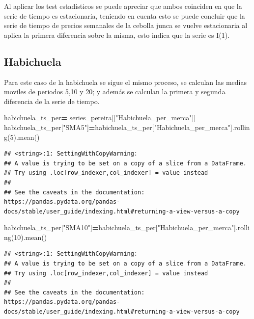 \documentclass[
]{book}
\newenvironment{Shaded}{\begin{snugshade}}{\end{snugshade}}
\newcommand{\DecValTok}[1]{\textcolor[rgb]{0.00,0.00,0.81}{#1}}
\newcommand{\NormalTok}[1]{#1}
\newcommand{\OperatorTok}[1]{\textcolor[rgb]{0.81,0.36,0.00}{\textbf{#1}}}
\newcommand{\StringTok}[1]{\textcolor[rgb]{0.31,0.60,0.02}{#1}}
\begin{document}
Al aplicar los test estadísticos se puede apreciar que ambos coinciden en que la serie de tiempo es estacionaria, teniendo en cuenta esto se puede concluir que la serie de tiempo de precios semanales de la cebolla junca se vuelve estacionaria al aplica la primera diferencia sobre la misma, esto indica que la serie es I(1).

\hypertarget{habichuela-1}{%
\subsection{Habichuela}\label{habichuela-1}}

Para este caso de la habichuela se sigue el mismo proceso, se calculan las medias moviles de periodos 5,10 y 20; y además se calculan la primera y segunda diferencia de la serie de tiempo.

\begin{Shaded}
\begin{Highlighting}[]

\NormalTok{habichuela\_ts\_per}\OperatorTok{=}\NormalTok{ series\_pereira[[}\StringTok{"Habichuela\_per\_merca"}\NormalTok{]]}
\NormalTok{habichuela\_ts\_per[}\StringTok{"SMA5"}\NormalTok{]}\OperatorTok{=}\NormalTok{habichuela\_ts\_per[}\StringTok{"Habichuela\_per\_merca"}\NormalTok{].rolling(}\DecValTok{5}\NormalTok{).mean()}
\end{Highlighting}
\end{Shaded}

\begin{verbatim}
## <string>:1: SettingWithCopyWarning: 
## A value is trying to be set on a copy of a slice from a DataFrame.
## Try using .loc[row_indexer,col_indexer] = value instead
## 
## See the caveats in the documentation: https://pandas.pydata.org/pandas-docs/stable/user_guide/indexing.html#returning-a-view-versus-a-copy
\end{verbatim}

\begin{Shaded}
\begin{Highlighting}[]
\NormalTok{habichuela\_ts\_per[}\StringTok{"SMA10"}\NormalTok{]}\OperatorTok{=}\NormalTok{habichuela\_ts\_per[}\StringTok{"Habichuela\_per\_merca"}\NormalTok{].rolling(}\DecValTok{10}\NormalTok{).mean()}
\end{Highlighting}
\end{Shaded}

\begin{verbatim}
## <string>:1: SettingWithCopyWarning: 
## A value is trying to be set on a copy of a slice from a DataFrame.
## Try using .loc[row_indexer,col_indexer] = value instead
## 
## See the caveats in the documentation: https://pandas.pydata.org/pandas-docs/stable/user_guide/indexing.html#returning-a-view-versus-a-copy
\end{verbatim}
\end{document}
